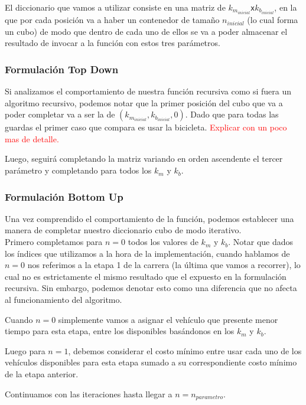 El diccionario que vamos a utilizar consiste en una matriz de $k_{m_{inicial}}$\texttt{x}$k_{b_{inicial}}$, en la que por cada posici\'on va a haber un contenedor de tama\~no $n_{inicial}$ (lo cual forma un cubo) de modo que dentro de cada uno de ellos se va a poder almacenar el resultado de invocar a la funci\'on con estos tres par\'ametros.

\subsubsection*{Formulaci\'on Top Down}

	Si analizamos el comportamiento de nuestra funci\'on recursiva como si fuera un algoritmo recursivo, podemos notar que la primer posici\'on del cubo que va a poder completar va a ser la de $(k_{m_{inicial}},k_{b_{inicial}},0)$. Dado que para todas las guardas el primer caso que compara es usar la bicicleta. \textcolor{red}{Explicar con un poco mas de detalle.}

	Luego, seguir\'a completando la matriz variando en orden ascendente el tercer par\'ametro y completando para todos los $k_m$ y $k_b$.

\subsubsection*{Formulaci\'on Bottom Up}


Una vez comprendido el comportamiento de la funci\'on, podemos establecer una manera de completar nuestro diccionario cubo de modo iterativo.\\

Primero completamos para $n=0$ todos los valores de $k_m$ y $k_b$. Notar que dados los \'indices que utilizamos a la hora de la implementaci\'on, cuando hablamos de $n=0$ nos referimos a la etapa 1 de la carrera (la \'ultima que vamos a recorrer), lo cual no es estrictamente el mismo resultado que el expuesto en la formulaci\'on recursiva. Sin embargo, podemos denotar esto como una diferencia que no afecta al funcionamiento del algoritmo.

Cuando $n=0$ simplemente vamos a asignar el veh\'iculo que presente menor tiempo para esta etapa, entre los disponibles bas\'andonos en los $k_m$ y $k_b$.

Luego para $n=1$, debemos considerar el costo m\'inimo entre usar cada uno de los veh\'iculos disponibles para esta etapa sumado a su correspondiente costo m\'inimo de la etapa anterior.

Continuamos con las iteraciones hasta llegar a $n=n_{parametro}$.\\

